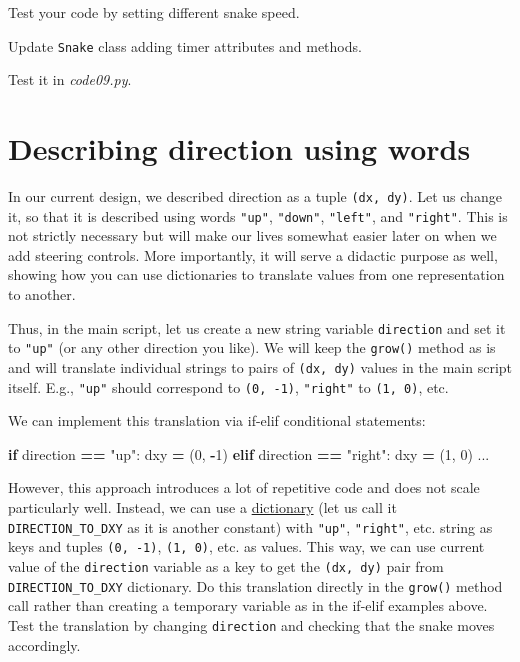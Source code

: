 \documentclass[
]{book}
\newenvironment{Shaded}{\begin{snugshade}}{\end{snugshade}}
\newcommand{\ControlFlowTok}[1]{\textcolor[rgb]{0.13,0.29,0.53}{\textbf{#1}}}
\newcommand{\DecValTok}[1]{\textcolor[rgb]{0.00,0.00,0.81}{#1}}
\newcommand{\NormalTok}[1]{#1}
\newcommand{\OperatorTok}[1]{\textcolor[rgb]{0.81,0.36,0.00}{\textbf{#1}}}
\newcommand{\StringTok}[1]{\textcolor[rgb]{0.31,0.60,0.02}{#1}}
\begin{document}
Test your code by setting different snake speed.

Update \texttt{Snake} class adding timer attributes and methods.

Test it in \emph{code09.py}.

\hypertarget{describing-direction-using-words}{%
\section{Describing direction using words}\label{describing-direction-using-words}}

In our current design, we described direction as a tuple \texttt{(dx,\ dy)}. Let us change it, so that it is described using words \texttt{"up"}, \texttt{"down"}, \texttt{"left"}, and \texttt{"right"}. This is not strictly necessary but will make our lives somewhat easier later on when we add steering controls. More importantly, it will serve a didactic purpose as well, showing how you can use dictionaries to translate values from one representation to another.

Thus, in the main script, let us create a new string variable \texttt{direction} and set it to \texttt{"up"} (or any other direction you like). We will keep the \texttt{grow()} method as is and will translate individual strings to pairs of \texttt{(dx,\ dy)} values in the main script itself. E.g., \texttt{"up"} should correspond to \texttt{(0,\ -1)}, \texttt{"right"} to \texttt{(1,\ 0)}, etc.

We can implement this translation via if-elif conditional statements:

\begin{Shaded}
\begin{Highlighting}[]
\ControlFlowTok{if}\NormalTok{ direction }\OperatorTok{==} \StringTok{"up"}\NormalTok{:}
\NormalTok{  dxy }\OperatorTok{=}\NormalTok{ (}\DecValTok{0}\NormalTok{, }\OperatorTok{{-}}\DecValTok{1}\NormalTok{)}
\ControlFlowTok{elif}\NormalTok{ direction }\OperatorTok{==} \StringTok{"right"}\NormalTok{:}
\NormalTok{  dxy }\OperatorTok{=}\NormalTok{ (}\DecValTok{1}\NormalTok{, }\DecValTok{0}\NormalTok{)}
\NormalTok{  ...}
\end{Highlighting}
\end{Shaded}

However, this approach introduces a lot of repetitive code and does not scale particularly well. Instead, we can use a \protect\hyperlink{dictionaries}{dictionary} (let us call it \texttt{DIRECTION\_TO\_DXY} as it is another constant) with \texttt{"up"}, \texttt{"right"}, etc. string as keys and tuples \texttt{(0,\ -1)}, \texttt{(1,\ 0)}, etc. as values. This way, we can use current value of the \texttt{direction} variable as a key to get the \texttt{(dx,\ dy)} pair from \texttt{DIRECTION\_TO\_DXY} dictionary. Do this translation directly in the \texttt{grow()} method call rather than creating a temporary variable as in the if-elif examples above. Test the translation by changing \texttt{direction} and checking that the snake moves accordingly.
\end{document}
